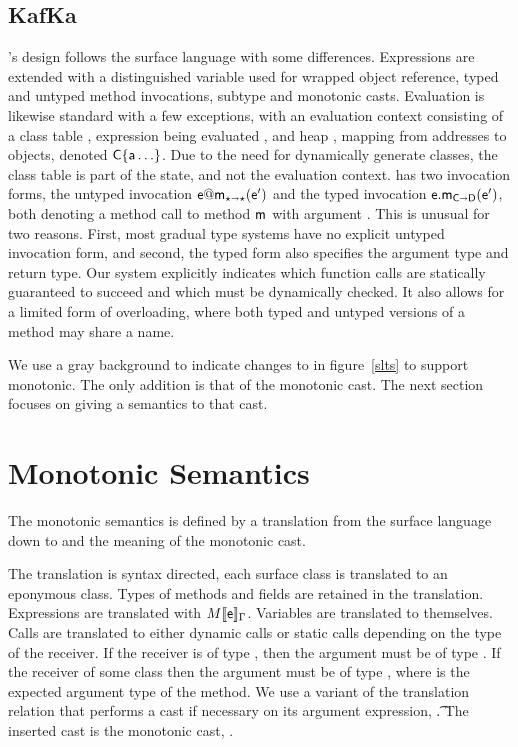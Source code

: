 \documentclass[sigconf]{acmart}
\begin{document}
\subsection{KafKa}

\kafka's design follows the surface language with some differences.
Expressions are extended with \that a distinguished variable used for
wrapped object reference, typed and untyped method invocations, subtype and
monotonic casts.  Evaluation is likewise standard with a few exceptions,
with an evaluation context consisting of a class table \K, expression
being evaluated \e, and heap \s, mapping from addresses \a to objects,
denoted $\C\{\a\ldots\}$. Due to the need for dynamically generate classes,
the class table \K is part of the state, and not the evaluation context.
\kafka has two invocation forms, the untyped invocation $\DynCall\e\m\ep$
and the typed invocation $\KCall\e\m\ep{\C}{\D}$, both denoting a method
call to method ${\sf{m}}$ with argument \ep. This is unusual for two
reasons. First, most gradual type systems have no explicit untyped
invocation form, and second, the typed form also specifies the argument type
and return type. Our system explicitly indicates which function calls are
statically guaranteed to succeed and which must be dynamically checked. It
also allows for a limited form of overloading, where both typed and untyped
versions of a method may share a name.

We use a gray background to indicate changes to \kafka in figure~\ref{slts} to
support monotonic. The only addition is that of the monotonic cast. The next
section focuses on giving a semantics to that cast.


\section{Monotonic Semantics}

The monotonic semantics is defined by a translation from the surface
language down to \kafka and the meaning of the monotonic cast. 

The translation is syntax directed, each surface class is translated to an
eponymous \kafka class. Types of methods and fields are retained in the
translation. Expressions are translated with $\TRG[M]{\e}\Env$. Variables
are translated to themselves. Calls are translated to either dynamic calls
or static calls depending on the type of the receiver.  If the receiver is
of type \any, then the argument must be of type \any. If the receiver of
some class \C then the argument must be of type \D, where \D is the expected
argument type of the method.  We use a variant of the translation relation
that performs a cast if necessary on its argument expression,
\TAG[M]{\e}{\Env}\t.  The inserted cast is the monotonic cast,
\MonCast{\t}{\ep}.
\end{document}
